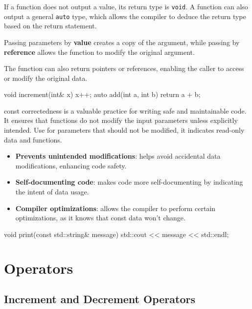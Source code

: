 If a function does not output a value, its return type is \texttt{void}.    
A function can also output a general \texttt{auto} type, which allows the compiler to deduce the return type based on the return statement.

Passing parameters by \textbf{value} creates a copy of the argument, while passing by \textbf{reference} allows the function to modify the original argument.

The function can also return pointers or references, enabling the caller to access or modify the original data.

\begin{exampleblock}
    \begin{codeblock}[language=C++]
void increment(int& x) {
    x++;
}
auto add(int a, int b) {
    return a + b;
}
    \end{codeblock}
\end{exampleblock}

\begin{warningblock}
    const correctedness is a valuable practice for writing safe and maintainable code. It ensures that functions do not modify the input parameters unless explicitly intended.
    Use  for parameters that should not be modified, it indicates read-only data and functions. 
    \begin{itemize}
        \item \textbf{Prevents unintended modifications}: helps avoid accidental data modifications, enhancing
        code safety.
        \item \textbf{Self-documenting code}: makes code more self-documenting by indicating the intent of data
        usage.
        \item \textbf{Compiler optimizations}: allows the compiler to perform certain optimizations, as it knows that
        const data won't change.
    \end{itemize}
    \begin{codeblock}[language=C++]
void print(const std::string& message) {
    std::cout << message << std::endl;
}
    \end{codeblock}
\end{warningblock}


\newpage
\section{Operators}

\subsection{Increment and Decrement Operators}

